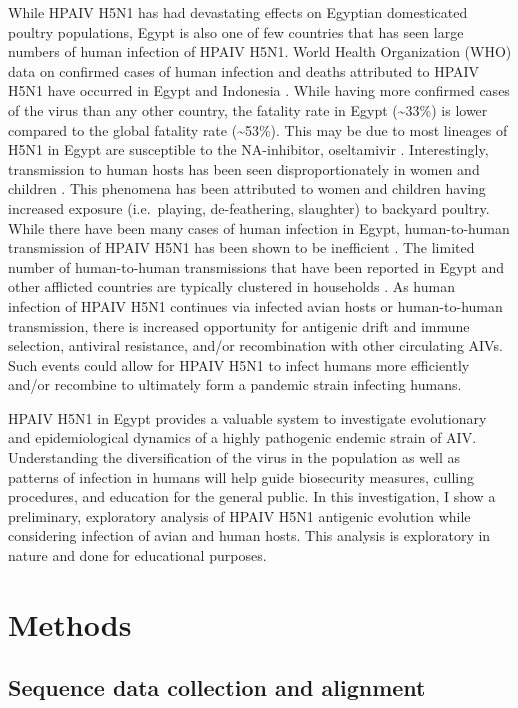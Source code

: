\documentclass[10pt,english]{article}
\begin{document}
While HPAIV H5N1 has had devastating effects on Egyptian domesticated poultry populations, Egypt is also one of few countries that has seen large numbers of human infection of HPAIV H5N1. World Health Organization (WHO) data on confirmed cases of human infection and deaths attributed to HPAIV H5N1 have occurred in Egypt and Indonesia \autocite{Who2019}. While having more confirmed cases of the virus than any other country, the fatality rate in Egypt (\textasciitilde 33\%) is lower compared to the global fatality rate (\textasciitilde 53\%). This may be due to most lineages of H5N1 in Egypt are susceptible to the NA-inhibitor, oseltamivir \autocite{Kayali2011}. Interestingly, transmission to human hosts has been seen disproportionately in women and children \autocite{Fasina2010, Abdelwhab2011}. This phenomena has been attributed to women and children having increased exposure (i.e.\ playing, de-feathering, slaughter) to backyard poultry. While there have been many cases of human infection in Egypt, human-to-human transmission of HPAIV H5N1 has been shown to be inefficient \autocite{Schroedl2010}. The limited number of human-to-human transmissions that have been reported in Egypt and other afflicted countries are typically clustered in households \autocite{Ungchusak2005, Kandeel2010, Gomaa2014}. As human infection of HPAIV H5N1 continues via infected avian hosts or human-to-human transmission, there is increased opportunity for antigenic drift and immune selection, antiviral resistance, and/or recombination with other circulating AIVs. Such events could allow for HPAIV H5N1 to infect humans more efficiently and/or recombine to ultimately form a pandemic strain infecting humans.

HPAIV H5N1 in Egypt provides a valuable system to investigate evolutionary and epidemiological dynamics of a highly pathogenic endemic strain of AIV. Understanding the diversification of the virus in the population as well as patterns of infection in humans will help guide biosecurity measures, culling procedures, and education for the general public. In this investigation, I show a preliminary, exploratory analysis of HPAIV H5N1 antigenic evolution while considering infection of avian and human hosts. This analysis is exploratory in nature and done for educational purposes. 

\section*{Methods}

\subsection*{Sequence data collection and alignment}
\end{document}
